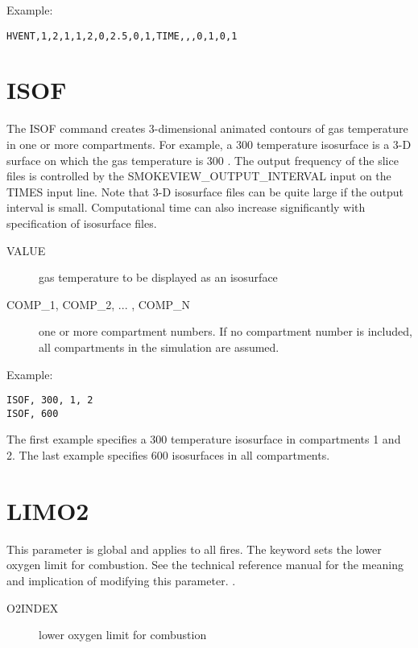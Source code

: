 \noindent Example:

\begin{lstlisting}
HVENT,1,2,1,1,2,0,2.5,0,1,TIME,,,0,1,0,1
\end{lstlisting}

\section{ISOF}

The ISOF command creates 3-dimensional animated contours of gas temperature in one or more compartments.  For example, a 300 \degc temperature isosurface is a 3-D surface on which the gas temperature is 300 \degc. The output frequency of the slice files is controlled by the SMOKEVIEW\_OUTPUT\_INTERVAL input on the TIMES input line. Note that 3-D isosurface files can be quite large if the output interval is small. Computational time can also increase significantly with specification of isosurface files.

\begin{adjustwidth}{1cm}{0cm}
\begin{description}
  \item[VALUE] gas temperature to be displayed as an isosurface
  \item[COMP\_1, COMP\_2, ... , COMP\_N] one or more compartment numbers. If no compartment number is included, all compartments in the simulation are assumed.
\end{description}
\end{adjustwidth}

\noindent Example:

\begin{lstlisting}
ISOF, 300, 1, 2
ISOF, 600
\end{lstlisting}

The first example specifies a 300 \degc temperature isosurface in compartments 1 and 2.  The last example specifies 600 \degc isosurfaces in all compartments.

\section{LIMO2}

This parameter is global and applies to all fires. The keyword sets the lower oxygen limit for combustion. See the technical reference manual for the meaning and implication of modifying this parameter. \cite{CFAST_Tech_Guide_7}.

\begin{adjustwidth}{1cm}{0cm}
\begin{description}
  \item[O2INDEX] lower oxygen limit for combustion
\end{description}
\end{adjustwidth}

